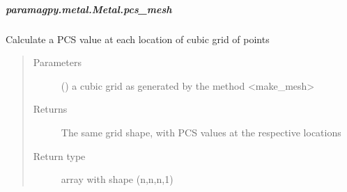 \documentclass[a4paper,10pt,english,openany,oneside]{sphinxmanual}
\begin{document}
\begin{fulllineitems}
\begin{fulllineitems}
\begin{fulllineitems}
\begin{quote}
\begin{description}
\end{description}\end{quote}

\end{fulllineitems}



\subparagraph{paramagpy.metal.Metal.pcs\_mesh}
\label{\detokenize{reference/generated/paramagpy.metal.Metal.pcs_mesh:paramagpy-metal-metal-pcs-mesh}}\label{\detokenize{reference/generated/paramagpy.metal.Metal.pcs_mesh::doc}}

\begin{fulllineitems}
\label{\detokenize{reference/generated/paramagpy.metal.Metal.pcs_mesh:paramagpy.metal.Metal.pcs_mesh}}
\sphinxAtStartPar
Calculate a PCS value at each location of cubic grid of points
\begin{quote}\begin{description}
\item[{Parameters}] \leavevmode
\sphinxAtStartPar
{} (\sphinxstyleliteralemphasis{\sphinxupquote{ (}}\sphinxstyleliteralemphasis{\sphinxupquote{,}}\sphinxstyleliteralemphasis{\sphinxupquote{,}}\sphinxstyleliteralemphasis{\sphinxupquote{,}}\sphinxstyleliteralemphasis{\sphinxupquote{)}}) \textendash{} a cubic grid as generated by the method \textless{}make\_mesh\textgreater{}

\item[{Returns}] \leavevmode
\sphinxAtStartPar
{} \textendash{} The same grid shape, with PCS values at the respective locations

\item[{Return type}] \leavevmode
\sphinxAtStartPar
array with shape (n,n,n,1)

\end{description}\end{quote}

\end{fulllineitems}




\end{fulllineitems}
\end{fulllineitems}
\end{document}

